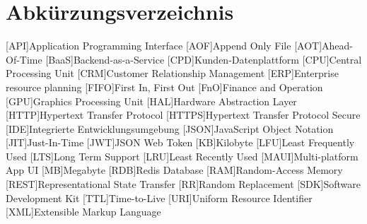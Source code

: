 \newpage
\section*{Abkürzungsverzeichnis}

\begin{acronym}[HTTPS]
    [API]{Application Programming Interface}
    [AOF]{Append Only File}
    [AOT]{Ahead-Of-Time}
    [BaaS]{Backend-as-a-Service}
    [CPD]{Kunden-Datenplattform}
    [CPU]{Central Processing Unit}
    [CRM]{Customer Relationship Management}
    [ERP]{Enterprise resource planning}
    [FIFO]{First In, First Out}
    [FnO]{Finance and Operation}
    [GPU]{Graphics Processing Unit}
    [HAL]{Hardware Abstraction Layer}
    [HTTP]{Hypertext Transfer Protocol}
    [HTTPS]{Hypertext Transfer Protocol Secure}
    [IDE]{Integrierte Entwicklungsumgebung}
    [JSON]{JavaScript Object Notation}
    [JIT]{Just-In-Time}
    [JWT]{JSON Web Token}
    [KB]{Kilobyte}
    [LFU]{Least Frequently Used}
    [LTS]{Long Term Support}
    [LRU]{Least Recently Used}
    [MAUI]{Multi-platform App UI}
    [MB]{Megabyte}
    [RDB]{Redis Database}
    [RAM]{Random-Access Memory}
    [REST]{Representational State Transfer}
    [RR]{Random Replacement}
    [SDK]{Software Development Kit}
    [TTL]{Time-to-Live}
    [URI]{Uniform Resource Identifier}
    [XML]{Extensible Markup Language}
\end{acronym}
